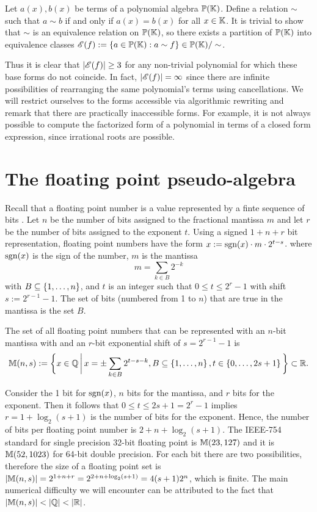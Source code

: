 \documentclass[]{elsarticle}
\begin{document}
Let $a(x),b(x)$ be terms of a polynomial algebra $\mathbb{P}(\mathbb{K})$. Define a relation $\sim$ such that $a\sim b$ if and only if $a(x)=b(x)$ for all $x\in\mathbb{K}$. It is trivial to show that $\sim$ is an equivalence relation on $\mathbb{P}(\mathbb{K})$, so there exists a partition of $\mathbb{P}(\mathbb{K})$ into equivalence classes
$\mathscr{E}(f) := \left\{ a\in\mathbb{P}(\mathbb{K}):a\sim f \right\}\in\mathbb{P}(\mathbb{K})/\sim$.

Thus it is clear that $|\mathscr{E}(f)|\geq3$ for any non-trivial polynomial for which these base forms do not coincide. 
In fact, $|\mathscr{E}(f)|=\infty$ since there are infinite possibilities of rearranging the same polynomial's terms using cancellations. 
We will restrict ourselves to the forms accessible via algorithmic rewriting and remark that there are practically inaccessible forms. 
For example, it is not always possible to compute the factorized form of a polynomial in terms of a closed form expression, since irrational roots are possible.

\section{The floating point pseudo-algebra}

Recall that a floating point number is a value represented by a finte sequence of bits \cite{higham}.
Let $n$ be the number of bits assigned to the fractional mantissa $m$ and let $r$ be the number of bits assigned to the exponent $t$. 
Using a signed $1+n+r$ bit representation, floating point numbers have the form
$ x := \text{sgn}(x)\cdot m \cdot 2^{t-s} $.
where $\text{sgn}(x)$ is the sign of the number, $m$ is the mantissa $$m = \sum_{k\in B}2^{-k}$$ with $B\subseteq\left\{ 1,\dots,n \right\}$, and $t$ is an integer such that $0\leq t\leq 2^r-1$ with shift $s := 2^{r-1}-1$.
The set of bits (numbered from 1 to $n$) that are true in the mantissa is the set $B$.
\begin{definition}
	The set of all floating point numbers that can be represented with an $n$-bit mantissa with and an $r$-bit exponential shift of $s=2^{r-1}-1$ is
	$$ \mathbb{M}(n,s) := \bigg\{x\in\mathbb{Q}\,\bigg|\,x = \pm\sum_{k\in B} 2^{t-s-k},B\subseteq\left\{ 1,\dots,n \right\},t\in\left\{ 0,\dots,2s+1 \right\}\bigg\}\subset\mathbb{R}. $$
\end{definition}
Consider the 1 bit for $\text{sgn}(x)$, $n$ bits for the mantissa, and $r$ bits for the exponent. Then it follows that $0\leq t\leq 2s+1 = 2^r-1$ implies $r = 1+\log_2(s+1)$ is the number of bits for the exponent.
Hence, the number of bits per floating point number is $2+n+\log_2(s+1)$.
The IEEE-754 standard for single precision 32-bit floating point is $\mathbb{M}(23,127)$ and it is $\mathbb{M}(52,1023)$ for 64-bit double precision.
For each bit there are two possibilities, therefore the size of a floating point set is $ |\mathbb{M}(n,s)| =2^{1+n+r} = 2^{2+n+\log_2(s+1)} = 4(s+1) 2^n$, which is finite.
The main numerical difficulty we will encounter can be attributed to the fact that $|\mb M(n,s)|<|\mb Q|<|\mb R|$.
\end{document}
